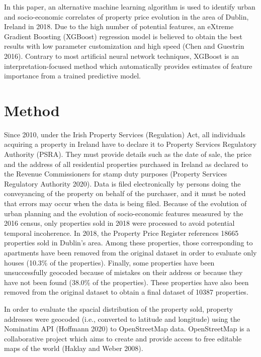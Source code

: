 \documentclass[conference,final,]{IEEEtran}
\begin{document}
In this paper, an alternative machine learning algorithm is used to identify urban and socio-economic correlates of property price evolution in the area of Dublin, Ireland in 2018. Due to the high number of potential features, an eXtreme Gradient Boosting (XGBoost) regression model is believed to obtain the best results with low parameter customization and high speed (Chen and Guestrin 2016). Contrary to most artificial neural network techniques, XGBoost is an interpretation-focused method which automatically provides estimates of feature importance from a trained predictive model.

\hypertarget{method}{%
\section{Method}\label{method}}

Since 2010, under the Irish Property Services (Regulation) Act, all individuals acquiring a property in Ireland have to declare it to Property Services Regulatory Authority (PSRA). They must provide details such as the date of sale, the price and the address of all residential properties purchased in Ireland as declared to the Revenue Commissioners for stamp duty purposes (Property Services Regulatory Authority 2020). Data is filed electronically by persons doing the conveyancing of the property on behalf of the purchaser, and it must be noted that errors may occur when the data is being filed.
Because of the evolution of urban planning and the evolution of socio-economic features measured by the 2016 census, only properties sold in 2018 were processed to avoid potential temporal incoherence. In 2018, the Property Price Register references 18665 properties sold in Dublin's area. Among these properties, those corresponding to apartments have been removed from the original dataset in order to evaluate only houses (10.3\% of the properties). Finally, some properties have been unsuccessfully geocoded because of mistakes on their address or because they have not been found (38.0\% of the properties). These properties have also been removed from the original dataset to obtain a final dataset of 10387 properties.

In order to evaluate the spacial distribution of the property sold, property addresses were geocoded (i.e., converted to latitude and longitude) using the Nominatim API (Hoffmann 2020) to OpenStreetMap data. OpenStreetMap is a collaborative project which aims to create and provide access to free editable maps of the world (Haklay and Weber 2008).
\end{document}

